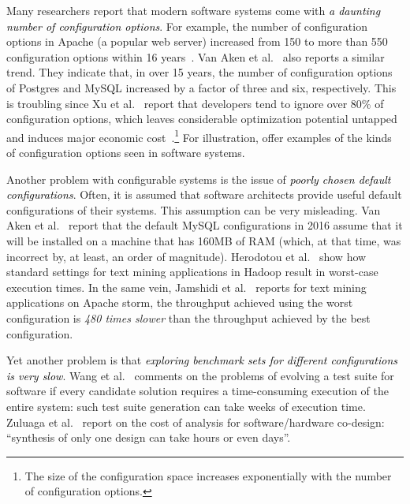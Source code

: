 Many researchers report that modern software systems come with \textcolor{black}{{\em a daunting number of configuration options}}. 
For example, the number of configuration options in Apache (a popular web server) increased from 150 to more than 550 configuration options within 16 years~\cite{xu2015hey}. 
Van Aken et al.~\cite{van2017automatic} also reports a similar trend. They indicate that, in over 15 years, the number of configuration options of {\sc Postgres} and {\sc MySQL} increased by a factor of three and six, respectively.
This is troubling since
Xu et al.~\cite{xu2015hey} report that developers tend to ignore over 80\% of configuration options, which leaves considerable optimization potential untapped and induces major economic cost~\cite{xu2015hey}.\footnote{The size of the configuration space increases exponentially  with the number of configuration options.} 
For illustration,  offer examples of the kinds of configuration options seen in software systems. 



Another problem  with configurable
systems is the issue of  \textcolor{black}{{\em poorly chosen default configurations}}.
Often, it is assumed that software architects provide useful default configurations of their systems.  This assumption can be very
misleading.   Van Aken et al.~\cite{van2017automatic} report that the default MySQL configurations in 2016 assume that it will be installed on a machine that has  160MB of RAM (which, at that
time, was incorrect by, at least, an order of magnitude). Herodotou et al.~\cite{herodotou2011starfish} show how standard settings for text mining
applications in Hadoop result in worst-case execution times.
In the same vein,  
Jamshidi et al.~\cite{jamshidi2016uncertainty} reports for
 text mining applications on Apache storm, the throughput achieved using the worst configuration is 
{\em 480 times slower} than the throughput achieved by the best configuration.

Yet another  problem
is that 
\textcolor{black}{{\em  exploring benchmark sets for different configurations is very slow}}. 
Wang et al.~\cite{wang2013searching} comments on the problems of evolving a test suite for software if every candidate solution requires a time-consuming execution of the entire system: such test suite generation can take weeks of execution time.
Zuluaga et al.~\cite{zuluaga2013active} report on the cost of analysis for software/hardware co-design: ``synthesis of only one design can take hours or even days''. 

